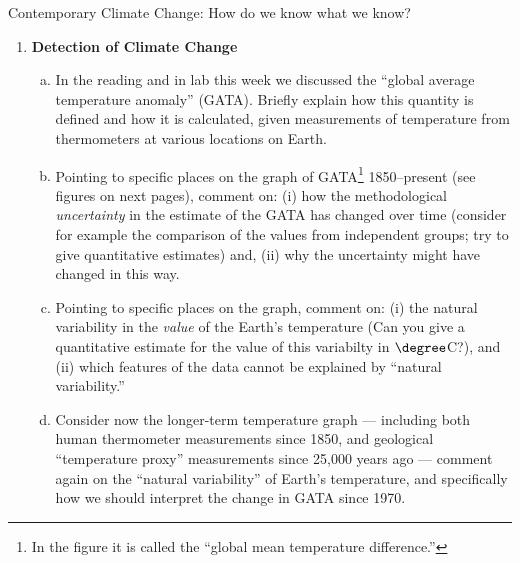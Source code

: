 \documentclass[12pt]{article}
\begin{document}
\begin{center}
{\Large Contemporary Climate Change: How do we know what we know?}
\end{center}



\begin{enumerate}

\item {\bf Detection of Climate Change} 
	\begin{enumerate}[(a)]
	\item In the reading and in lab this week we discussed the ``global average temperature anomaly'' (GATA). Briefly explain how this quantity is defined and how it is calculated, given measurements of temperature from thermometers at various locations on Earth. 
	\item Pointing to specific places on the graph of GATA\footnote{In the figure it is called the ``global mean temperature difference.''} 1850--present (see figures on next pages), comment on: (i) how the methodological {\em uncertainty} in the estimate of the GATA has changed over time (consider for example the comparison of the values from independent groups; try to give quantitative estimates) and, (ii) why the uncertainty might have changed in this way.
	\item Pointing to specific places on the graph, comment on: (i) the natural variability in the {\em value} of the Earth's temperature (Can you give a quantitative estimate for the value of this variabilty in $\degree$C?), and (ii) which features of the data cannot be explained by ``natural variability.''  
	\item Consider now the longer-term temperature graph ---  including both human thermometer measurements since 1850, and geological  ``temperature proxy'' measurements since 25,000 years ago --- comment again on the ``natural variability''  of Earth's temperature, and specifically how we should interpret the change in GATA since 1970.
		
	\end{enumerate}


\end{enumerate}
\end{document}
